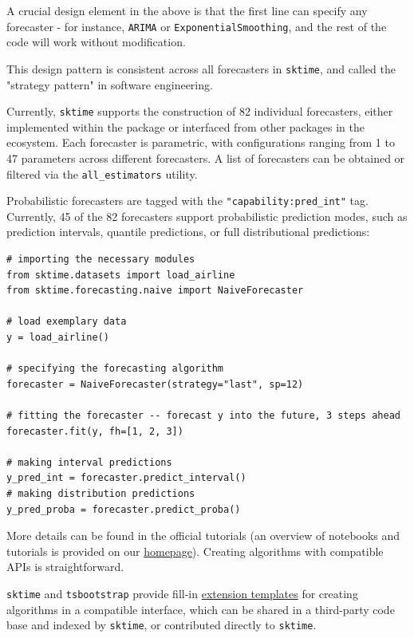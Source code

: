 A crucial design element in the above is that the first line can specify any forecaster - for instance, \texttt{ARIMA} or \texttt{ExponentialSmoothing},
and the rest of the code will work without modification.

This design pattern is consistent across all forecasters in \texttt{sktime}, and called the "strategy pattern" in software engineering.

Currently, \texttt{sktime} supports the construction of 82 individual forecasters, either implemented within the package or interfaced from other packages in the ecosystem. Each forecaster is parametric, with configurations ranging from 1 to 47 parameters across different forecasters. A list of forecasters can be obtained or filtered via the \texttt{all\_estimators} utility.

Probabilistic forecasters are tagged with the \texttt{"capability:pred\_int"} tag. Currently, 45 of the 82 forecasters support probabilistic prediction modes, such as prediction intervals, quantile predictions, or full distributional predictions:

\begin{verbatim}
# importing the necessary modules
from sktime.datasets import load_airline
from sktime.forecasting.naive import NaiveForecaster

# load exemplary data
y = load_airline()

# specifying the forecasting algorithm
forecaster = NaiveForecaster(strategy="last", sp=12)

# fitting the forecaster -- forecast y into the future, 3 steps ahead
forecaster.fit(y, fh=[1, 2, 3])

# making interval predictions
y_pred_int = forecaster.predict_interval()
# making distribution predictions
y_pred_proba = forecaster.predict_proba()
\end{verbatim}

More details can be found in the official tutorials (an overview of notebooks and tutorials is provided on our \href{https://www.sktime.net/en/latest/users.html}{homepage}).
Creating algorithms with compatible APIs is straightforward.

\texttt{sktime} and \texttt{tsbootstrap} provide fill-in \href{https://github.com/sktime/sktime/tree/main/extension_templates}{extension templates} for creating algorithms in a compatible interface, which can be shared in a third-party code base and indexed by \texttt{sktime}, or contributed directly to \texttt{sktime}.

